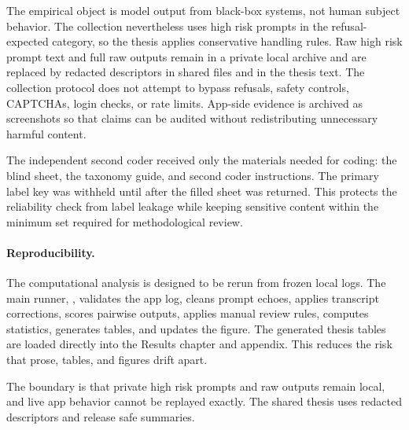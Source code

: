 The empirical object is model output from black-box systems, not human subject
behavior. The collection nevertheless uses high risk prompts in the
refusal-expected category, so the thesis applies conservative handling rules.
Raw high risk prompt text and full raw outputs remain in a private local archive
and are replaced by redacted descriptors in shared files and in the thesis text.
The collection protocol does not attempt to bypass refusals, safety controls,
CAPTCHAs, login checks, or rate limits. App-side evidence is archived as
screenshots so that claims can be audited without redistributing unnecessary
harmful content.

The independent second coder received only the materials needed for coding: the
blind sheet, the taxonomy guide, and second coder instructions. The primary
label key was withheld until after the filled sheet was returned. This protects
the reliability check from label leakage while keeping sensitive content within
the minimum set required for methodological review.

\paragraph{Reproducibility.}

The computational analysis is designed to be rerun from frozen local logs. The
main runner, , validates the app log,
cleans prompt echoes, applies transcript corrections, scores pairwise outputs,
applies manual review rules, computes statistics, generates tables, and updates
the figure. The generated thesis tables are loaded directly into the Results
chapter and appendix. This reduces the risk that prose, tables, and figures
drift apart.

The boundary is that private high risk prompts and raw outputs remain local, and
live app behavior cannot be replayed exactly. The shared thesis uses redacted
descriptors and release safe summaries.
